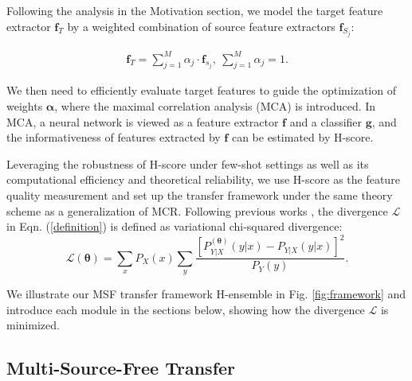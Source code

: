 \documentclass[letterpaper]{article} %
\begin{document}
Following the analysis in the Motivation section, we model the target feature extractor $\boldsymbol{f}_T$  by a weighted combination of source feature extractors $\boldsymbol{f}_{S_j}$:

\begin{equation}
    \begin{aligned}
        \boldsymbol{f}_T = \sum_{j=1}^M \alpha_j \cdot \boldsymbol{f}_{s_j}, \ \sum_{j=1}^M \alpha_j = 1 .
    \end{aligned}
    \label{targetfeature}
\end{equation}

We then need to efficiently evaluate target features to guide the optimization of weights $\boldsymbol{\alpha}$, where the maximal correlation analysis (MCA) is introduced. In MCA, a neural network is viewed as a feature extractor $\boldsymbol{f}$ and a classifier $\boldsymbol{g}$, and the informativeness of features extracted by $\boldsymbol{f}$ can be estimated by H-score.

Leveraging the robustness of H-score under few-shot settings as well as its computational efficiency and theoretical reliability, we use H-score as the feature quality measurement and set up the transfer framework under the same theory scheme as a generalization of MCR. Following previous works \citep{xu2020maximal}, the divergence $\mathcal L$ in Eqn. (\ref{definition}) is defined as variational chi-squared divergence:
\begin{equation}
    \mathcal L(\boldsymbol{\theta}) = \sum_x P_X(x) \sum_y \frac{[P^{(\boldsymbol{\theta})}_{Y|X} (y|x) - P_{Y|X} (y|x)]^2}{P_Y(y)}.
\end{equation}

We illustrate our MSF transfer framework H-ensemble in Fig. \ref{fig:framework} and introduce each module in the sections below, showing how the divergence $\mathcal L$ is minimized.

\subsection{Multi-Source-Free Transfer}


\end{document}
